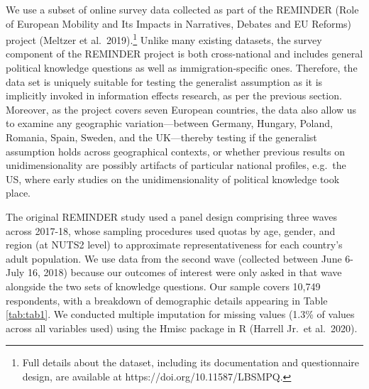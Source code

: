 \documentclass[12pt,halfline,a4paper,]{ouparticle}
\begin{document}
We use a subset of online survey data collected as part of the REMINDER
(Role of European Mobility and Its Impacts in Narratives, Debates and EU
Reforms) project (Meltzer et al.~2019).\footnote{Full details about the
  dataset, including its documentation and questionnaire design, are
  available at https://doi.org/10.11587/LBSMPQ.} Unlike many existing
datasets, the survey component of the REMINDER project is both
cross-national and includes general political knowledge questions as
well as immigration-specific ones. Therefore, the data set is uniquely
suitable for testing the generalist assumption as it is implicitly
invoked in information effects research, as per the previous section.
Moreover, as the project covers seven European countries, the data also
allow us to examine any geographic variation---between Germany, Hungary,
Poland, Romania, Spain, Sweden, and the UK---thereby testing if the
generalist assumption holds across geographical contexts, or whether
previous results on unidimensionality are possibly artifacts of
particular national profiles, e.g.~the US, where early studies on the
unidimensionality of political knowledge took place.

The original REMINDER study used a panel design comprising three waves
across 2017-18, whose sampling procedures used quotas by age, gender,
and region (at NUTS2 level) to approximate representativeness for each
country's adult population. We use data from the second wave (collected
between June 6-July 16, 2018) because our outcomes of interest were only
asked in that wave alongside the two sets of knowledge questions. Our
sample covers 10,749 respondents, with a breakdown of demographic
details appearing in Table \ref{tab:tab1}. We conducted multiple
imputation for missing values (1.3\% of values across all variables
used) using the Hmisc package in R (Harrell Jr.~et al.~2020).
\end{document}
